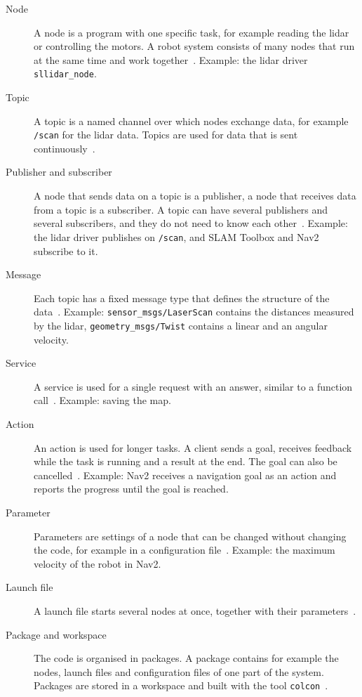 \begin{description}
  \item[Node] A node is a program with one specific task, for example reading the lidar or controlling the motors. A robot system consists of many nodes that run at the same time and work together~\citep{ros2_jazzy}. Example: the lidar driver \texttt{sllidar\_node}.

  \item[Topic] A topic is a named channel over which nodes exchange data, for example \texttt{/scan} for the lidar data. Topics are used for data that is sent continuously~\citep{ros2_jazzy}.

  \item[Publisher and subscriber] A node that sends data on a topic is a publisher, a node that receives data from a topic is a subscriber. A topic can have several publishers and several subscribers, and they do not need to know each other~\citep{ros2_jazzy}. Example: the lidar driver publishes on \texttt{/scan}, and SLAM Toolbox and Nav2 subscribe to it.

  \item[Message] Each topic has a fixed message type that defines the structure of the data~\citep{ros2_jazzy}. Example: \texttt{sensor\_msgs/LaserScan} contains the distances measured by the lidar, \texttt{geometry\_msgs/Twist} contains a linear and an angular velocity.

  \item[Service] A service is used for a single request with an answer, similar to a function call~\citep{ros2_jazzy}. Example: saving the map.

  \item[Action] An action is used for longer tasks. A client sends a goal, receives feedback while the task is running and a result at the end. The goal can also be cancelled~\citep{ros2_jazzy}. Example: Nav2 receives a navigation goal as an action and reports the progress until the goal is reached.

  \item[Parameter] Parameters are settings of a node that can be changed without changing the code, for example in a configuration file~\citep{ros2_jazzy}. Example: the maximum velocity of the robot in Nav2.

  \item[Launch file] A launch file starts several nodes at once, together with their parameters~\citep{ros2_jazzy}.

  \item[Package and workspace] The code is organised in packages. A package contains for example the nodes, launch files and configuration files of one part of the system. Packages are stored in a workspace and built with the tool \texttt{colcon}~\citep{ros2_jazzy}.
\end{description}


